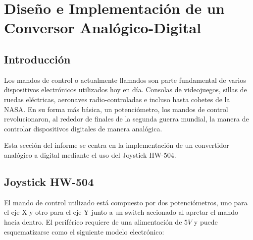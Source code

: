 

\tableofcontents

\section{Diseño e Implementación de un Conversor Analógico-Digital}

\subsection{Introducción}

Los mandos de control o actualmente llamados  son parte fundamental de varios dispositivos electrónicos utilizados hoy en día. Consolas de videojuegos, sillas de ruedas eléctricas, aeronaves radio-controladas e incluso hasta cohetes de la NASA. En su forma más básica, un potenciómetro, los mandos de control revolucionaron, al rededor de finales de la segunda guerra mundial, la manera de controlar dispositivos digitales de manera analógica. 

Esta sección del informe se centra en la implementación de un convertidor analógico a digital mediante el uso del Joystick HW-504.

\subsection{Joystick HW-504}

El mando de control utilizado está compuesto por dos potenciómetros, uno para el eje X y otro para el eje Y junto a un switch accionado al apretar el mando hacia dentro. El periférico requiere de una alimentación de $5V$ y puede esquematizarse como el siguiente modelo electrónico:

